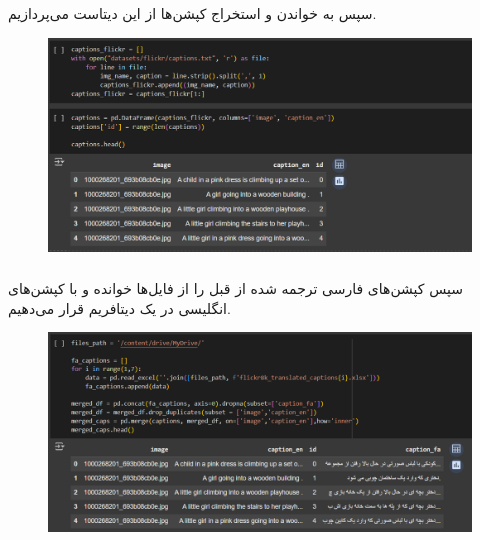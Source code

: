 \documentclass[12pt]{article}
\begin{document}
	\subsubsection{}
	سپس به خواندن و استخراج کپشن‌ها از این دیتاست می‌پردازیم.
	\begin{figure}[H]
		\centering
		\includegraphics[width=0.9\linewidth]{pic_4}
	\end{figure}
	\subsubsection{}
	سپس کپشن‌های فارسی ترجمه شده از قبل را از فایل‌ها خوانده و با کپشن‌های انگلیسی در یک دیتافریم  قرار می‌دهیم.
	\begin{figure}[H]
		\centering
		\includegraphics[width=0.9\linewidth]{pic_5}
	\end{figure}
\end{document}
